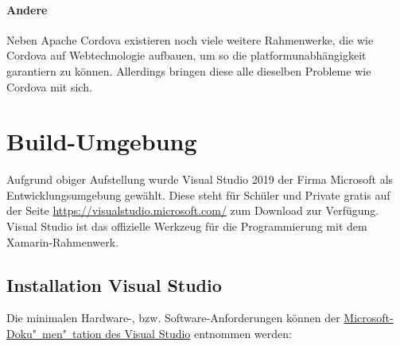 \paragraph{Andere}
Neben Apache Cordova existieren noch viele weitere Rahmenwerke, die wie Cordova auf Webtechnologie aufbauen, um so die platformunabhängigkeit garantiern zu können. Allerdings bringen diese alle dieselben Probleme wie Cordova mit sich.

\section{Build-Umgebung}
Aufgrund obiger Aufstellung wurde Visual Studio 2019 der Firma Microsoft als Entwicklungsumgebung gewählt.
Diese steht für Schüler und Private gratis auf der Seite {\href{https://visualstudio.microsoft.com/}{https://visualstudio.microsoft.com/}} zum Download zur Verfügung.
Visual Studio ist das offizielle Werkzeug für die Programmierung mit dem Xamarin-Rahmenwerk.

%
\subsection{Installation Visual Studio} %
Die minimalen Hardware-, bzw. Software-Anforderungen können der \href{https://docs.microsoft.com/en-us/visualstudio/releases/2019/system-requirements}{Microsoft-Doku"~men"~tation des Visual Studio} entnommen werden:

